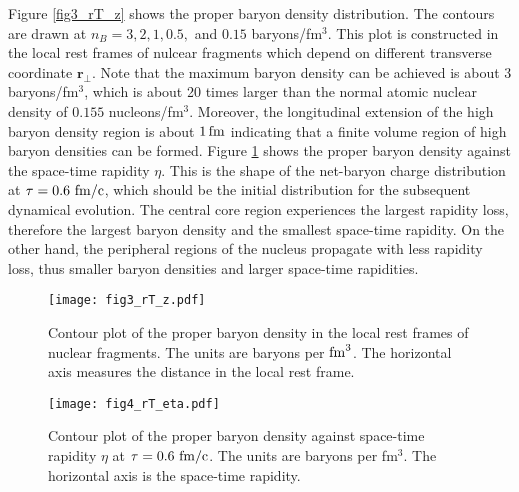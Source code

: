 \documentclass[a4paper]{jpconf}
\begin{document}
Figure \ref{fig3_rT_z} shows the proper baryon density distribution. The contours are drawn at $n_B = 3, 2, 1, 0.5,$ and $0.15$ baryons/fm$^3$. This plot is constructed in the local rest frames of nulcear fragments which depend on different transverse coordinate $\mathbf{r}_{\perp}$. Note that the maximum baryon density can be achieved is about $3$ baryons/fm$^3$, which is about 20 times larger than the normal atomic nuclear density of $0.155$ nucleons/fm$^3$. Moreover, the longitudinal extension of the high baryon density region is about $1\,\rm{fm}$ indicating that a finite volume region of high baryon densities can be formed.  Figure \ref{fig4_rT_eta} shows the proper baryon density against the space-time rapidity $\eta$.  This is the shape of the net-baryon charge distribution at $\tau= 0.6 \,\,\rm{fm/c}$, which should be the initial distribution for the subsequent dynamical evolution. The central core region experiences the largest rapidity loss, therefore the largest baryon density and the smallest space-time rapidity.  On the other hand, the peripheral regions of the nucleus propagate with less rapidity loss, thus smaller baryon densities and larger space-time rapidities.
\begin{figure}[h]
\begin{minipage}{0.5\textwidth}
\centering
\texttt{[image: fig3\_rT\_z.pdf]}
\caption{\small Contour plot of the proper baryon density in the local rest frames of nuclear fragments. The units are baryons per $\rm{fm}^3$. The horizontal axis measures the distance in the local rest frame.}
\label{fig3_rT_z}
\end{minipage}
\hspace{0.1in}
\begin{minipage}{0.5\textwidth}
\centering
\texttt{[image: fig4\_rT\_eta.pdf]}
\caption{\small Contour plot of the proper baryon density against space-time rapidity $\eta$ at $\tau = 0.6\,\, \rm{fm/c}$. The units are baryons per fm$^3$. The horizontal axis is the space-time rapidity.}
\label{fig4_rT_eta}
\end{minipage}
\end{figure}
\end{document}
